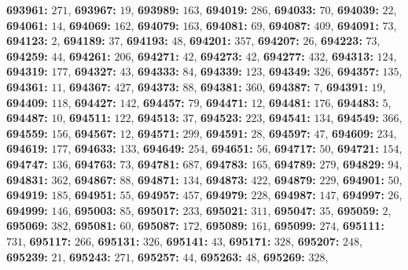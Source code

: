\textsf{\bfseries 693961:} $271$, \textsf{\bfseries 693967:} $19$, \textsf{\bfseries 693989:} $163$, \textsf{\bfseries 694019:} $286$, \textsf{\bfseries 694033:} $70$, \textsf{\bfseries 694039:} $22$, \textsf{\bfseries 694061:} $14$, \textsf{\bfseries 694069:} $162$, \textsf{\bfseries 694079:} $163$, \textsf{\bfseries 694081:} $69$, \textsf{\bfseries 694087:} $409$, \textsf{\bfseries 694091:} $73$, \textsf{\bfseries 694123:} $2$, \textsf{\bfseries 694189:} $37$, \textsf{\bfseries 694193:} $48$, \textsf{\bfseries 694201:} $357$, \textsf{\bfseries 694207:} $26$, \textsf{\bfseries 694223:} $73$, \textsf{\bfseries 694259:} $44$, \textsf{\bfseries 694261:} $206$, \textsf{\bfseries 694271:} $42$, \textsf{\bfseries 694273:} $42$, \textsf{\bfseries 694277:} $432$, \textsf{\bfseries 694313:} $124$, \textsf{\bfseries 694319:} $177$, \textsf{\bfseries 694327:} $43$, \textsf{\bfseries 694333:} $84$, \textsf{\bfseries 694339:} $123$, \textsf{\bfseries 694349:} $326$, \textsf{\bfseries 694357:} $135$, \textsf{\bfseries 694361:} $11$, \textsf{\bfseries 694367:} $427$, \textsf{\bfseries 694373:} $88$, \textsf{\bfseries 694381:} $360$, \textsf{\bfseries 694387:} $7$, \textsf{\bfseries 694391:} $19$, \textsf{\bfseries 694409:} $118$, \textsf{\bfseries 694427:} $142$, \textsf{\bfseries 694457:} $79$, \textsf{\bfseries 694471:} $12$, \textsf{\bfseries 694481:} $176$, \textsf{\bfseries 694483:} $5$, \textsf{\bfseries 694487:} $10$, \textsf{\bfseries 694511:} $122$, \textsf{\bfseries 694513:} $37$, \textsf{\bfseries 694523:} $223$, \textsf{\bfseries 694541:} $134$, \textsf{\bfseries 694549:} $366$, \textsf{\bfseries 694559:} $156$, \textsf{\bfseries 694567:} $12$, \textsf{\bfseries 694571:} $299$, \textsf{\bfseries 694591:} $28$, \textsf{\bfseries 694597:} $47$, \textsf{\bfseries 694609:} $234$, \textsf{\bfseries 694619:} $177$, \textsf{\bfseries 694633:} $133$, \textsf{\bfseries 694649:} $254$, \textsf{\bfseries 694651:} $56$, \textsf{\bfseries 694717:} $50$, \textsf{\bfseries 694721:} $154$, \textsf{\bfseries 694747:} $136$, \textsf{\bfseries 694763:} $73$, \textsf{\bfseries 694781:} $687$, \textsf{\bfseries 694783:} $165$, \textsf{\bfseries 694789:} $279$, \textsf{\bfseries 694829:} $94$, \textsf{\bfseries 694831:} $362$, \textsf{\bfseries 694867:} $88$, \textsf{\bfseries 694871:} $134$, \textsf{\bfseries 694873:} $422$, \textsf{\bfseries 694879:} $229$, \textsf{\bfseries 694901:} $50$, \textsf{\bfseries 694919:} $185$, \textsf{\bfseries 694951:} $55$, \textsf{\bfseries 694957:} $457$, \textsf{\bfseries 694979:} $228$, \textsf{\bfseries 694987:} $147$, \textsf{\bfseries 694997:} $26$, \textsf{\bfseries 694999:} $146$, \textsf{\bfseries 695003:} $85$, \textsf{\bfseries 695017:} $233$, \textsf{\bfseries 695021:} $311$, \textsf{\bfseries 695047:} $35$, \textsf{\bfseries 695059:} $2$, \textsf{\bfseries 695069:} $382$, \textsf{\bfseries 695081:} $60$, \textsf{\bfseries 695087:} $172$, \textsf{\bfseries 695089:} $161$, \textsf{\bfseries 695099:} $274$, \textsf{\bfseries 695111:} $731$, \textsf{\bfseries 695117:} $266$, \textsf{\bfseries 695131:} $326$, \textsf{\bfseries 695141:} $43$, \textsf{\bfseries 695171:} $328$, \textsf{\bfseries 695207:} $248$, \textsf{\bfseries 695239:} $21$, \textsf{\bfseries 695243:} $271$, \textsf{\bfseries 695257:} $44$, \textsf{\bfseries 695263:} $48$, \textsf{\bfseries 695269:} $328$, 
